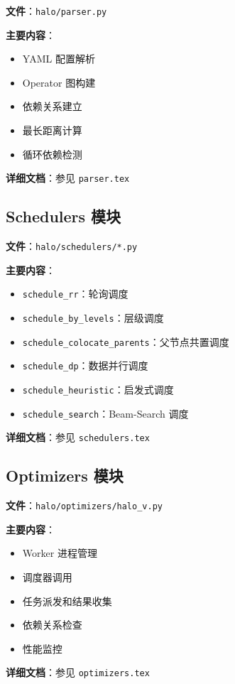 \documentclass[12pt,a4paper]{article}
\begin{document}
\textbf{文件}：\texttt{halo/parser.py}

\textbf{主要内容}：
\begin{itemize}
    \item YAML 配置解析
    \item Operator 图构建
    \item 依赖关系建立
    \item 最长距离计算
    \item 循环依赖检测
\end{itemize}

\textbf{详细文档}：参见 \texttt{parser.tex}

\subsection{Schedulers 模块}

\textbf{文件}：\texttt{halo/schedulers/*.py}

\textbf{主要内容}：
\begin{itemize}
    \item \texttt{schedule\_rr}：轮询调度
    \item \texttt{schedule\_by\_levels}：层级调度
    \item \texttt{schedule\_colocate\_parents}：父节点共置调度
    \item \texttt{schedule\_dp}：数据并行调度
    \item \texttt{schedule\_heuristic}：启发式调度
    \item \texttt{schedule\_search}：Beam-Search 调度
\end{itemize}

\textbf{详细文档}：参见 \texttt{schedulers.tex}

\subsection{Optimizers 模块}

\textbf{文件}：\texttt{halo/optimizers/halo\_v.py}

\textbf{主要内容}：
\begin{itemize}
    \item Worker 进程管理
    \item 调度器调用
    \item 任务派发和结果收集
    \item 依赖关系检查
    \item 性能监控
\end{itemize}

\textbf{详细文档}：参见 \texttt{optimizers.tex}
\end{document}
